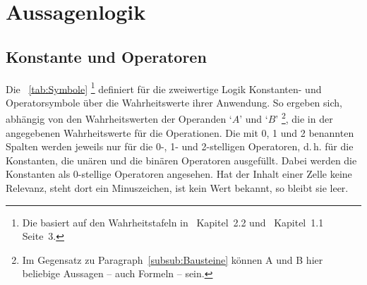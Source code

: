 \documentclass[english,ngerman,parskip=half,headsepline,footsepline,
	fleqn,notitlepage]{scrreprt}
\makeatletter
\newcommand*{\texthead}[1]{\textnormal{\textsf{\textbf{#1}}}}%
\newcommand*{\Lohead}[1]{\lohead{\texthead{#1}}}
\newcommand*{\Cohead}[1]{\cohead{\texthead{#1}}}
\newcommand*{\Pagestyle}{\pagestyle{scrheadings}}
\newcommand*{\beginsection}[1]{%
	\Cohead{#1}%
	\Lohead{\sectionname~\thesection}%
	\Pagestyle%
}
\newcommand*{\charqt}[1]{\enquote*{#1}}%
\newcommand*{\symqt}[1]{\charqt{#1}}%
\newcommand*{\sectionname}{Abschnitt}
\newcommand*{\subsubsectionname}{Paragraph}
\newcommand*{\textdh}{d.\@\,h.\@ }
\makeatother
\begin{document}
	\section{Aussagenlogik}%
	\beginsection{Aussagenlogik}
	\label{sec:Aussagenlogik}

	\subsection{Konstante und Operatoren}%
	\label{sub:Operatoren}

	Die \tablename~\vref{tab:Symbole}
	\footnote{%
		Die \tablename{} basiert auf den Wahrheitstafeln in~\cite{bib:Junktor}
		Kapitel~2.2 und~\cite{bib:Rautenberg} Kapitel~1.1 Seite~3.%
	}
	definiert für die zweiwertige Logik Konstanten- und Operatorsymbole
	über die Wahrheitswerte ihrer Anwendung.
	So ergeben sich,
	abhängig von den Wahrheitswerten der Operanden \symqt{$A$} und \symqt{$B$}
	\footnote{%
		Im Gegensatz zu \subsubsectionname~\vref{subsub:Bausteine}
		können A und B hier beliebige Aussagen -- auch Formeln -- sein.%
	},
	die in der \tablename{} angegebenen Wahrheitswerte für die Operationen.
	Die mit 0, 1 und 2 benannten Spalten werden jeweils
	nur für die 0-, 1- und 2-stelligen Operatoren, \textdh
	für die Konstanten, die unären und die binären Operatoren ausgefüllt.
	Dabei werden die Konstanten als 0-stellige Operatoren angesehen.
	Hat der Inhalt einer Zelle keine Relevanz, steht dort ein Minuszeichen,
	ist kein Wert bekannt, so bleibt sie leer.

	                                        
	 \setcounter{pnequiv} {\value{prio}}
	  \setcounter{pequiv}  {\value{prio}} 
	   \setcounter{pnrep}   {\value{prio}}
	    \setcounter{prep}    {\value{prio}}
	   \setcounter{pnimp}   {\value{prio}}
	    \setcounter{pimp}    {\value{prio}} 
	    \setcounter{padd}    {\value{prio}}
	    \setcounter{pxor}    {\value{prio}}
	    \setcounter{pnor}    {\value{prio}}
	     \setcounter{por}     {\value{prio}} 
	   \setcounter{pmult}   {\value{prio}}
	   \setcounter{pnand}   {\value{prio}}
	    \setcounter{pand}    {\value{prio}} 
	    \setcounter{pnot}    {\value{prio}}
\end{document}
